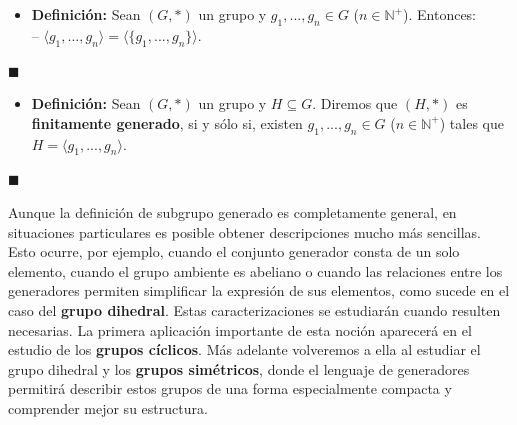 \documentclass[10 pt]{article}
\begin{document}
\begin{itemize}
    \item \Large{\textbf{Definición:} Sean $(G,*)$ un grupo y $g_1,...,g_n \in G$ ($n \in \mathbb N^+$). Entonces: \\

    -- $\langle g_1,...,g_n\rangle=\langle \{g_1,...,g_n\}\rangle$.} \\
\end{itemize}

\begin{flushright}
    $\blacksquare$
\end{flushright}

\begin{itemize}
    \item \Large{\textbf{Definición:} Sean $(G,*)$ un grupo y $H \subseteq G$. Diremos que $(H,*)$ es \textbf{finitamente generado}, si y sólo si, existen $g_1,...,g_n \in G$ ($n \in \mathbb N^+$) tales que $H=\langle g_1,...,g_n \rangle$.} \\
\end{itemize}

\begin{flushright}
    $\blacksquare$
\end{flushright}

\Large{Aunque la definición de subgrupo generado es completamente general, en situaciones particulares es posible obtener descripciones mucho más sencillas. Esto ocurre, por ejemplo, cuando el conjunto generador consta de un solo elemento, cuando el grupo ambiente es abeliano o cuando las relaciones entre los generadores permiten simplificar la expresión de sus elementos, como sucede en el caso del \textbf{grupo dihedral}. Estas caracterizaciones se estudiarán cuando resulten necesarias. La primera aplicación importante de esta noción aparecerá en el estudio de los \textbf{grupos cíclicos}. Más adelante volveremos a ella al estudiar el grupo dihedral y los \textbf{grupos simétricos}, donde el lenguaje de generadores permitirá describir estos grupos de una forma especialmente compacta y comprender mejor su estructura.} \\
\end{document}
